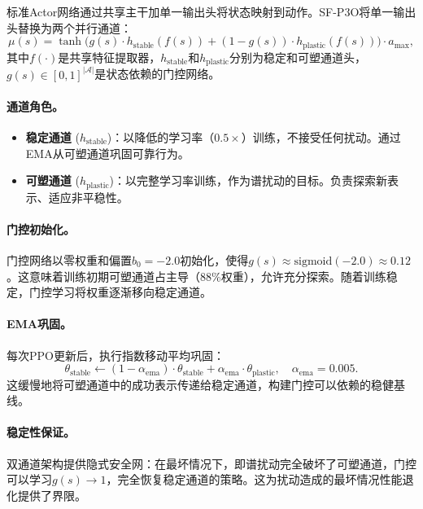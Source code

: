 \documentclass[twocolumn]{article}
\begin{document}
标准Actor网络通过共享主干加单一输出头将状态映射到动作。SF-P3O将单一输出头替换为两个并行通道：
\begin{equation}
    \mu(s) = \tanh\!\Big(g(s) \cdot h_{\text{stable}}(f(s)) + (1 {-} g(s)) \cdot h_{\text{plastic}}(f(s))\Big) \cdot a_{\max},
    \label{eq:dual_pathway}
\end{equation}
其中$f(\cdot)$是共享特征提取器，$h_{\text{stable}}$和$h_{\text{plastic}}$分别为稳定和可塑通道头，$g(s) \in [0,1]^{|\mathcal{A}|}$是状态依赖的门控网络。

\paragraph{通道角色。}
\begin{itemize}[leftmargin=*]
    \item \textbf{稳定通道} ($h_{\text{stable}}$)：以降低的学习率（$0.5\times$）训练，不接受任何扰动。通过EMA从可塑通道巩固可靠行为。
    \item \textbf{可塑通道} ($h_{\text{plastic}}$)：以完整学习率训练，作为谱扰动的目标。负责探索新表示、适应非平稳性。
\end{itemize}

\paragraph{门控初始化。}
门控网络以零权重和偏置$b_0 = -2.0$初始化，使得$g(s) \approx \text{sigmoid}(-2.0) \approx 0.12$。这意味着训练初期可塑通道占主导（88\%权重），允许充分探索。随着训练稳定，门控学习将权重逐渐移向稳定通道。

\paragraph{EMA巩固。}
每次PPO更新后，执行指数移动平均巩固：
\begin{equation}
    \theta_{\text{stable}} \leftarrow (1 - \alpha_{\text{ema}}) \cdot \theta_{\text{stable}} + \alpha_{\text{ema}} \cdot \theta_{\text{plastic}}, \quad \alpha_{\text{ema}} = 0.005.
\end{equation}
这缓慢地将可塑通道中的成功表示传递给稳定通道，构建门控可以依赖的稳健基线。

\paragraph{稳定性保证。}
双通道架构提供隐式安全网：在最坏情况下，即谱扰动完全破坏了可塑通道，门控可以学习$g(s) \to 1$，完全恢复稳定通道的策略。这为扰动造成的最坏情况性能退化提供了界限。
\end{document}
